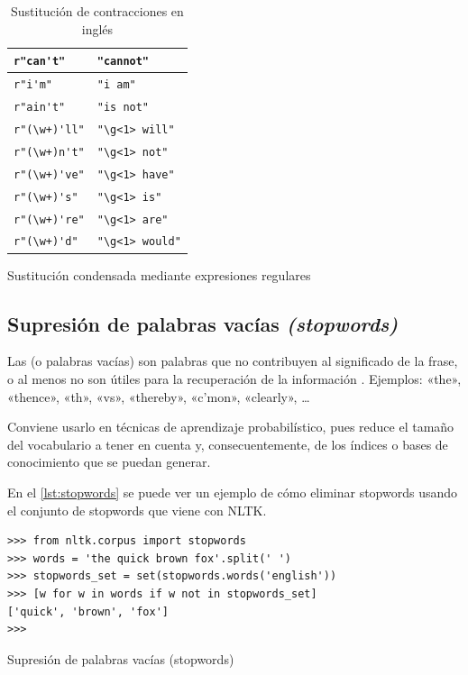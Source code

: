 \begin{table}[htbp]
\begin{subtable}[t]{0.45\linewidth}
\begin{tabular}{|l|l|}
\verb=r"can't"= & \verb="cannot"= \\ \hline
\verb=r"i'm"= & \verb="i am"= \\ \hline
\verb=r"ain't"= & \verb="is not"= \\ \hline
\verb=r"(\w+)'ll"= & \verb="\g<1> will"= \\ \hline
\verb=r"(\w+)n't"= & \verb="\g<1> not"= \\ \hline
\verb=r"(\w+)'ve"= & \verb="\g<1> have"= \\ \hline
\verb=r"(\w+)'s"= & \verb="\g<1> is"= \\ \hline
\verb=r"(\w+)'re"= & \verb="\g<1> are"= \\ \hline
\verb=r"(\w+)'d"= & \verb="\g<1> would"= \\ \hline
\end{tabular}
\caption{Sustitución condensada mediante expresiones regulares}
\label{tbl:contracciones-regexp}
\end{subtable}
\vfill
\caption{Sustitución de contracciones en inglés}
\label{tbl:contracciones}
\end{table}

\FloatBarrier
\subsection{Supresión de palabras vacías \emph{(stopwords)}}

Las  (o palabras vacías) son palabras que no contribuyen al significado de la frase, o al menos no son útiles para la recuperación de la información \citep{Perkins2010}. Ejemplos: «the», «thence», «th», «vs», «thereby», «c'mon», «clearly», \ldots

Conviene usarlo en técnicas de aprendizaje probabilístico, pues reduce el tamaño del vocabulario a tener en cuenta y, consecuentemente, de los índices o bases de conocimiento que se puedan generar.

En el \autoref{lst:stopwords} se puede ver un ejemplo de cómo eliminar stopwords usando el conjunto de stopwords que viene con NLTK.

\begin{listing}[htbp]
\begin{verbatim}
>>> from nltk.corpus import stopwords
>>> words = 'the quick brown fox'.split(' ')
>>> stopwords_set = set(stopwords.words('english'))
>>> [w for w in words if w not in stopwords_set]
['quick', 'brown', 'fox']
>>> 
\end{verbatim}
\caption{Supresión de palabras vacías (stopwords)}
\label{lst:stopwords}
\end{listing}

